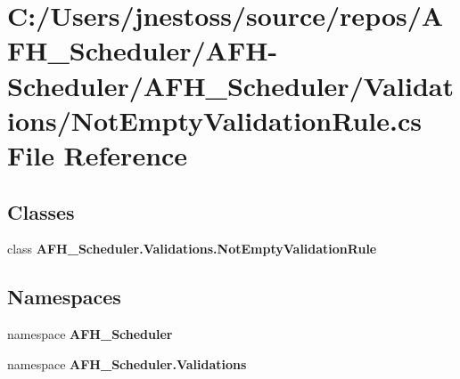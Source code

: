 \section{C\+:/\+Users/jnestoss/source/repos/\+A\+F\+H\+\_\+\+Scheduler/\+A\+F\+H-\/\+Scheduler/\+A\+F\+H\+\_\+\+Scheduler/\+Validations/\+Not\+Empty\+Validation\+Rule.cs File Reference}
\label{_not_empty_validation_rule_8cs}
\subsection*{Classes}
\begin{DoxyCompactItemize}
\item 
class \textbf{ A\+F\+H\+\_\+\+Scheduler.\+Validations.\+Not\+Empty\+Validation\+Rule}
\end{DoxyCompactItemize}
\subsection*{Namespaces}
\begin{DoxyCompactItemize}
\item 
namespace \textbf{ A\+F\+H\+\_\+\+Scheduler}
\item 
namespace \textbf{ A\+F\+H\+\_\+\+Scheduler.\+Validations}
\end{DoxyCompactItemize}
